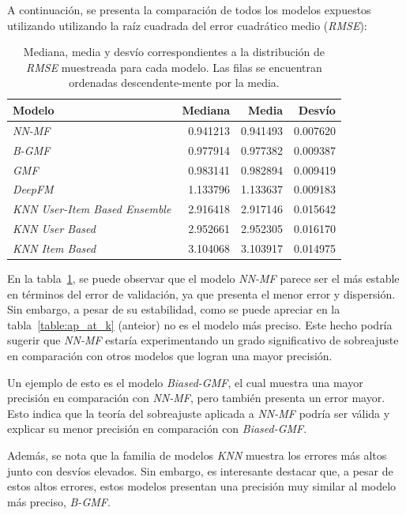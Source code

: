 \documentclass[11pt,a4paper,twoside]{thesis}
\begin{document}
A continuación, se presenta la comparación de todos los modelos expuestos
utilizando utilizando la raíz cuadrada del error cuadrático medio
(\textit{RMSE}):

\begin{table}[!htb]
	\centering
	\footnotesize
	\begin{tabular}{lrrr}
		\hline
		Modelo                                & Mediana  & Media    & Desvío   \\
		\hline
		\textit{NN-MF}                        & 0.941213 & 0.941493 & 0.007620 \\
		\textit{B-GMF}                        & 0.977914 & 0.977382 & 0.009387 \\
		\textit{GMF}                          & 0.983141 & 0.982894 & 0.009419 \\
		\textit{DeepFM}                       & 1.133796 & 1.133637 & 0.009183 \\
		\textit{KNN User-Item Based Ensemble} & 2.916418 & 2.917146 & 0.015642 \\
		\textit{KNN User Based}               & 2.952661 & 2.952305 & 0.016170 \\
		\textit{KNN Item Based}               & 3.104068 & 3.103917 & 0.014975 \\
		\hline
	\end{tabular}
	\caption{
		Mediana, media y desvío correspondientes a la distribución de
		\textit{RMSE} muestreada para cada modelo. Las filas se
		encuentran ordenadas  descendente-mente por la media.}
	\label{table:rmse}
\end{table}

En la tabla~\ref{table:rmse}, se puede observar que el modelo \textit{NN-MF}
parece ser el más estable en términos del error de validación, ya que presenta
el menor error y dispersión. Sin embargo, a pesar de su estabilidad, como se
puede apreciar en la tabla~\ref{table:ap_at_k} (anteior) no es el modelo más
preciso. Este hecho podría sugerir que \textit{NN-MF} estaría experimentando un
grado significativo de sobreajuste en comparación con otros modelos que logran
una mayor precisión.

Un ejemplo de esto es el modelo \textit{Biased-GMF}, el cual muestra una mayor
precisión en comparación con \textit{NN-MF}, pero también presenta un error
mayor. Esto indica que la teoría del sobreajuste aplicada a \textit{NN-MF}
podría ser válida y explicar su menor precisión en comparación con
\textit{Biased-GMF}.

Además, se nota que la familia de modelos \textit{KNN} muestra los errores más
altos junto con desvíos elevados. Sin embargo, es interesante destacar que, a
pesar de estos altos errores, estos modelos presentan una precisión muy similar
al modelo más preciso, \textit{B-GMF}.
\end{document}
